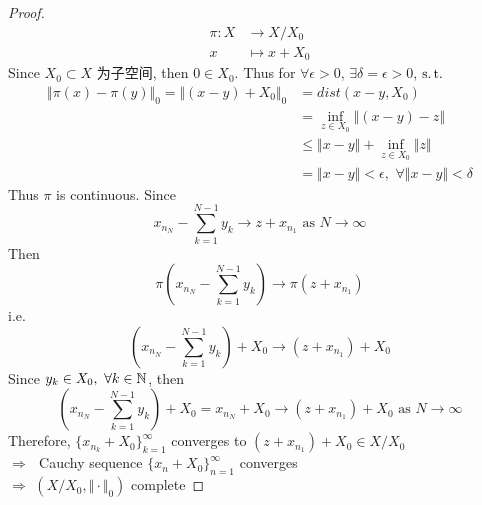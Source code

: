 \begin{thm}
\begin{proof}
\begin{align}
				\pi : X &\longrightarrow X / X_0 \\
				x &\longmapsto x + X_0
			\end{align}
			Since $X_0 \subset X$ 为子空间, then $0 \in X_0$. Thus for $\forall \epsilon > 0$, $\exists \delta = \epsilon > 0$, $\operatorname{s.t.}$
			\begin{align}
				\Vert \pi(x) - \pi(y) \Vert_0 
				= \Vert (x - y) + X_0 \Vert_0 
				&= dist(x - y , X_0) \\
				&= \inf_{z \in X_0} \Vert (x - y) - z \Vert \\
				&\leq \Vert x - y \Vert + \inf_{z \in X_0} \Vert z \Vert \\
				&= \Vert x - y \Vert 
				< \epsilon , \,\, \forall \Vert x - y \Vert < \delta
			\end{align}
			Thus $\pi$ is continuous. Since
			\[ x_{n_N} - \sum_{k = 1}^{N - 1} y_k \to z + x_{n_1} \,\, \text{as} \,\, N \to \infty \]
			Then
			\[ \pi \left( x_{n_N} - \sum_{k = 1}^{N - 1} y_k \right) \to \pi(z + x_{n_1}) \]
			i.e.
			\[ \left( x_{n_N} - \sum_{k = 1}^{N - 1} y_k \right) + X_0 \to (z + x_{n_1}) + X_0 \]
			Since $y_k \in X_0 , \,\, \forall k \in \mathbb{N}$, then
			\[ \left( x_{n_N} - \sum_{k = 1}^{N - 1} y_k \right) + X_0 = x_{n_N} + X_0 \to (z + x_{n_1}) + X_0 \,\, \text{as} \,\, N \to \infty \]
			Therefore, $\{ x_{n_k} + X_0 \}_{k = 1}^{\infty}$ converges to $(z + x_{n_1}) + X_0 \in X / X_0$ \\
			$\Rightarrow \,\,$ Cauchy sequence $\{ x_n + X_0 \}_{n = 1}^{\infty}$ converges \\
			$\Rightarrow \,\, (X / X_0 , \Vert \cdot \Vert_0)$ complete
		\end{proof}
	\end{thm}






	\ifx\allfiles\undefined

\fi